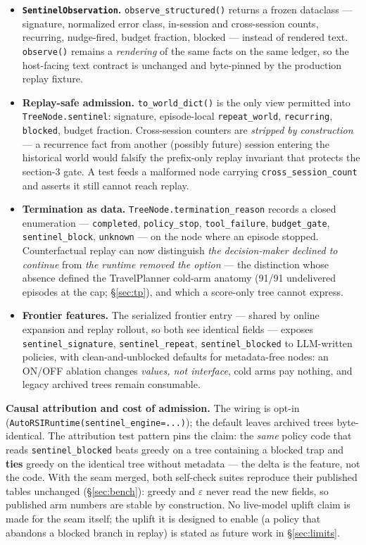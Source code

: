 \documentclass[11pt,a4paper]{article}
\newcommand{\hdr}[1]{\textbf{#1}}
\begin{document}
\begin{itemize}
  \item \hdr{\texttt{SentinelObservation}.}
  \texttt{observe\_structured()} returns a frozen dataclass --- signature,
  normalized error class, in-session and cross-session counts, recurring,
  nudge-fired, budget fraction, blocked --- instead of rendered text.
  \texttt{observe()} remains a \emph{rendering} of the same facts on the
  same ledger, so the host-facing text contract is unchanged and byte-pinned
  by the production replay fixture.
  \item \hdr{Replay-safe admission.} \texttt{to\_world\_dict()} is the only
  view permitted into \texttt{TreeNode.sentinel}: signature,
  episode-local \texttt{repeat\_world}, \texttt{recurring},
  \texttt{blocked}, budget fraction. Cross-session counters are
  \emph{stripped by construction} --- a recurrence fact from another
  (possibly future) session entering the historical world would falsify the
  prefix-only replay invariant that protects the section-3 gate. A test
  feeds a malformed node carrying \texttt{cross\_session\_count} and asserts
  it still cannot reach replay.
  \item \hdr{Termination as data.} \texttt{TreeNode.termination\_reason}
  records a closed enumeration --- \texttt{completed},
  \texttt{policy\_stop}, \texttt{tool\_failure}, \texttt{budget\_gate},
  \texttt{sentinel\_block}, \texttt{unknown} --- on the node where an
  episode stopped. Counterfactual replay can now distinguish
  \emph{the decision-maker declined to continue} from \emph{the runtime
  removed the option} --- the distinction whose absence defined the
  TravelPlanner cold-arm anatomy (91/91 undelivered episodes at the cap;
  \S\ref{sec:tp}), and which a score-only tree cannot express.
  \item \hdr{Frontier features.} The serialized frontier entry --- shared
  by online expansion and replay rollout, so both see identical fields ---
  exposes \texttt{sentinel\_signature}, \texttt{sentinel\_repeat},
  \texttt{sentinel\_blocked} to LLM-written policies, with
  clean-and-unblocked defaults for metadata-free nodes: an ON/OFF ablation
  changes \emph{values, not interface}, cold arms pay nothing, and legacy
  archived trees remain consumable.
\end{itemize}

\hdr{Causal attribution and cost of admission.} The wiring is opt-in
(\texttt{AutoRSIRuntime(sentinel\_engine=...)}); the default leaves
archived trees byte-identical. The attribution test pattern pins the claim:
the \emph{same} policy code that reads \texttt{sentinel\_blocked} beats
greedy on a tree containing a blocked trap and \textbf{ties} greedy on the
identical tree without metadata --- the delta is the feature, not the code.
With the seam merged, both self-check suites reproduce their published
tables unchanged (\S\ref{sec:bench}): greedy and $\varepsilon$ never read
the new fields, so published arm numbers are stable by construction. No
live-model uplift claim is made for the seam itself; the uplift it is
designed to enable (a policy that abandons a blocked branch in replay) is
stated as future work in \S\ref{sec:limits}.
\end{document}
